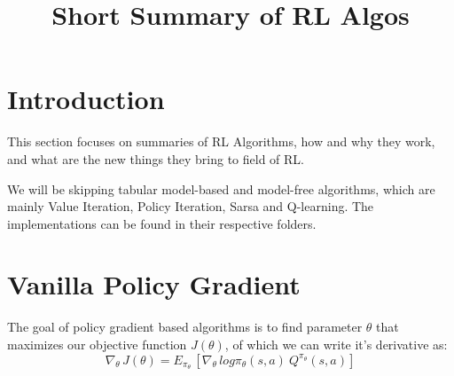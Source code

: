 \documentclass[12pt]{article} %
\title{Short Summary of RL Algos}
\author{}
\date{}
\begin{document}
\maketitle

\tableofcontents

\newpage

\section{Introduction}
This section focuses on summaries of RL Algorithms, how and why they work, and what are the new things they bring to field of RL.

We will be skipping tabular model-based and model-free algorithms, which are mainly Value Iteration, Policy Iteration, Sarsa and Q-learning. The implementations can be found in their respective folders.
\section{Vanilla Policy Gradient}
The goal of policy gradient based algorithms is to find parameter $\theta$ that maximizes our objective function $J(\theta)$, of which we can write it's derivative as:
\begin{equation*}
    \nabla_\theta\, J(\theta) = E_{\pi_\theta}\,[\nabla_\theta\,log \pi_\theta(s,a)\: Q^{\pi_\theta}(s,a)]
\end{equation*}
\end{document}
